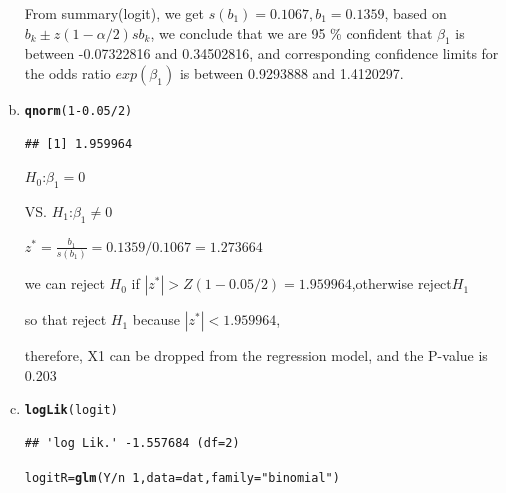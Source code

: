 \documentclass{article}\usepackage[]{graphicx}\usepackage[]{color}
\makeatletter
\newcommand{\hlnum}[1]{\textcolor[rgb]{0.686,0.059,0.569}{#1}}%
\newcommand{\hlstr}[1]{\textcolor[rgb]{0.192,0.494,0.8}{#1}}%
\newcommand{\hlopt}[1]{\textcolor[rgb]{0,0,0}{#1}}%
\newcommand{\hlstd}[1]{\textcolor[rgb]{0.345,0.345,0.345}{#1}}%
\newcommand{\hlkwb}[1]{\textcolor[rgb]{0.69,0.353,0.396}{#1}}%
\newcommand{\hlkwc}[1]{\textcolor[rgb]{0.333,0.667,0.333}{#1}}%
\newcommand{\hlkwd}[1]{\textcolor[rgb]{0.737,0.353,0.396}{\textbf{#1}}}%
\newenvironment{kframe}{%
 \def\at@end@of@kframe{}%
 \ifinner\ifhmode%
  \def\at@end@of@kframe{\end{minipage}}%
  \begin{minipage}{\columnwidth}%
 \fi\fi%
 \def\FrameCommand##1{\hskip\@totalleftmargin \hskip-\fboxsep
 \colorbox{shadecolor}{##1}\hskip-\fboxsep
     \hskip-\linewidth \hskip-\@totalleftmargin \hskip\columnwidth}%
 \MakeFramed {\advance\hsize-\width
   \@totalleftmargin\z@ \linewidth\hsize
   \@setminipage}}%
 {\par\unskip\endMakeFramed%
 \at@end@of@kframe}
\newenvironment{knitrout}{}{} %
\makeatother
\begin{document}
\begin{enumerate}[(a)]
\qquad From summary(logit), we get $s(b_1) = 0.1067, b_1 = 0.1359$, based on $b_k \pm z(1-\alpha/2)s{b_k}$, we conclude that we are 95 \% confident that $\beta_1$ is between -0.07322816 and 0.34502816, and corresponding confidence limits for the odds ratio $exp(\beta_1)$ is between 0.9293888 and 1.4120297.

\item

\begin{knitrout}
\color{fgcolor}\begin{kframe}
\begin{alltt}
  \hlkwd{qnorm}\hlstd{(}\hlnum{1}\hlopt{-}\hlnum{0.05}\hlopt{/}\hlnum{2}\hlstd{)}
\end{alltt}
\begin{verbatim}
## [1] 1.959964
\end{verbatim}
\end{kframe}
\end{knitrout}

\begin{center}
$H_0$:$\beta_1=0$

VS. $H_1$:$\beta_1 \ne 0$

$z^*=\frac{b_1}{s(b_1)} = 0.1359/0.1067   = 1.273664$

we can reject $H_0$ if $|z^*| > Z(1-0.05/2)=1.959964$,otherwise reject$H_1$

so that reject $H_1$ because $|z^*|<1.959964$,

therefore, X1 can be dropped from the regression model, and the P-value is 0.203
\end{center}

\item

\begin{knitrout}
\color{fgcolor}\begin{kframe}
\begin{alltt}
  \hlkwd{logLik}\hlstd{(logit)}
\end{alltt}
\begin{verbatim}
## 'log Lik.' -1.557684 (df=2)
\end{verbatim}
\begin{alltt}
  \hlstd{logitR} \hlkwb{=} \hlkwd{glm}\hlstd{(Y}\hlopt{/}\hlstd{n} \hlopt{~} \hlnum{1}\hlstd{,} \hlkwc{data} \hlstd{= dat,} \hlkwc{family} \hlstd{=} \hlstr{"binomial"}\hlstd{)}
\end{alltt}



\end{kframe}
\end{knitrout}
\end{enumerate}
\end{document}
